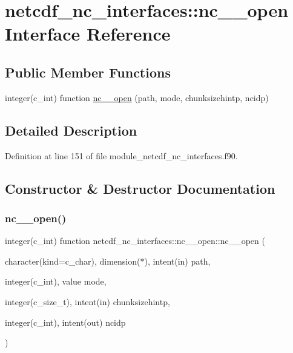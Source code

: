 \hypertarget{interfacenetcdf__nc__interfaces_1_1nc____open}{}\section{netcdf\+\_\+nc\+\_\+interfaces\+:\+:nc\+\_\+\+\_\+open Interface Reference}
\label{interfacenetcdf__nc__interfaces_1_1nc____open}
\subsection*{Public Member Functions}
\begin{DoxyCompactItemize}
\item 
integer(c\+\_\+int) function \hyperlink{interfacenetcdf__nc__interfaces_1_1nc____open_a365c5fd8f73550bfdce2c5285e43b805}{nc\+\_\+\+\_\+open} (path, mode, chunksizehintp, ncidp)
\end{DoxyCompactItemize}


\subsection{Detailed Description}


Definition at line 151 of file module\+\_\+netcdf\+\_\+nc\+\_\+interfaces.\+f90.



\subsection{Constructor \& Destructor Documentation}
\mbox{\label{interfacenetcdf__nc__interfaces_1_1nc____open_a365c5fd8f73550bfdce2c5285e43b805}} 
\subsubsection{\texorpdfstring{nc\+\_\+\+\_\+open()}{nc\_\_open()}}
{\footnotesize\ttfamily integer(c\+\_\+int) function netcdf\+\_\+nc\+\_\+interfaces\+::nc\+\_\+\+\_\+open\+::nc\+\_\+\+\_\+open (\begin{DoxyParamCaption}\item[{character(kind=c\+\_\+char), dimension($\ast$), intent(in)}]{path,  }\item[{integer(c\+\_\+int), value}]{mode,  }\item[{integer(c\+\_\+size\+\_\+t), intent(in)}]{chunksizehintp,  }\item[{integer(c\+\_\+int), intent(out)}]{ncidp }\end{DoxyParamCaption})}



